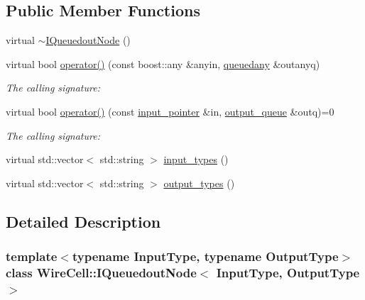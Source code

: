 \subsection*{Public Member Functions}
\begin{DoxyCompactItemize}
\item 
virtual \hyperlink{class_wire_cell_1_1_i_queuedout_node_a108a312ac858f484c69a614974fbd70a}{$\sim$\+I\+Queuedout\+Node} ()
\item 
virtual bool \hyperlink{class_wire_cell_1_1_i_queuedout_node_a38fcceec4026ddc65245206b24e62265}{operator()} (const boost\+::any \&anyin, \hyperlink{class_wire_cell_1_1_i_queuedout_node_base_a9c144f13ef75e051847fe22888977a11}{queuedany} \&outanyq)
\begin{DoxyCompactList}\small\item\em The calling signature\+: \end{DoxyCompactList}\item 
virtual bool \hyperlink{class_wire_cell_1_1_i_queuedout_node_a0c00d8011d718b474984287133d5841a}{operator()} (const \hyperlink{class_wire_cell_1_1_i_queuedout_node_acf5f716a764553f3c7055a9cf67e906e}{input\+\_\+pointer} \&in, \hyperlink{class_wire_cell_1_1_i_queuedout_node_a39018e4e3dd886befac9636ac791a685}{output\+\_\+queue} \&outq)=0
\begin{DoxyCompactList}\small\item\em The calling signature\+: \end{DoxyCompactList}\item 
virtual std\+::vector$<$ std\+::string $>$ \hyperlink{class_wire_cell_1_1_i_queuedout_node_a5289285ab7c2f8117e9aff75dcbb8077}{input\+\_\+types} ()
\item 
virtual std\+::vector$<$ std\+::string $>$ \hyperlink{class_wire_cell_1_1_i_queuedout_node_ae80f97293240e876e6d47202e7b3cc59}{output\+\_\+types} ()
\end{DoxyCompactItemize}


\subsection{Detailed Description}
\subsubsection*{template$<$typename Input\+Type, typename Output\+Type$>$\newline
class Wire\+Cell\+::\+I\+Queuedout\+Node$<$ Input\+Type, Output\+Type $>$}



